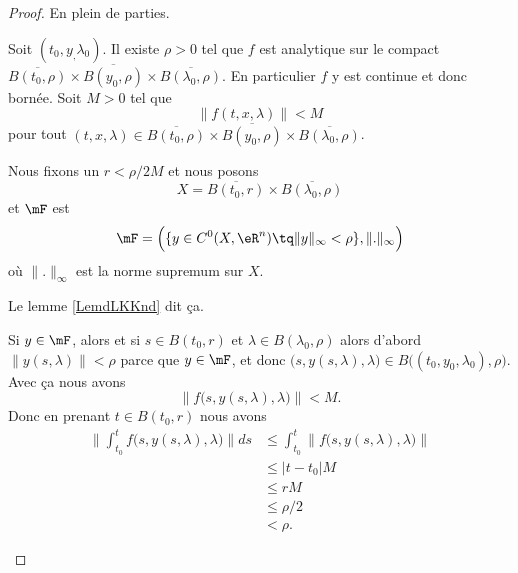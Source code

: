 \begin{proof}
	En plein de parties.
	\begin{subproof}
		Soit \( (t_0,y_,\lambda_0)\). Il existe \( \rho>0\) tel que \( f\) est analytique sur le compact \( \overline{B(t_0,\rho)}\times \overline{B(y_0,\rho)}\times \overline{B(\lambda_0,\rho)}\). En particulier \( f\) y est continue et donc bornée. Soit \( M>0\) tel que
		\begin{equation}
			\| f(t,x,\lambda) \|<M
		\end{equation}
		pour tout \( (t,x,\lambda)\in \overline{B(t_0,\rho)}\times \overline{B(y_0,\rho)}\times \overline{B(\lambda_0,\rho)}\).

		\spitem[L'espace \( \mF\)]
		Nous fixons un \( r<\rho/2M\) et nous posons
		\begin{equation}
			X=\overline{B(t_0,r)}\times \overline{B(\lambda_0,\rho)}
		\end{equation}
		et \( \mF\) est
		\begin{equation}
			\mF=\Big(   \{ y\in C^0(X,\eR^n)\tq \| y \|_{\infty}<\rho \},\| . \|_{\infty} \Big)
		\end{equation}
		où \( \| . \|_{\infty}\) est la norme supremum sur \( X\).

		Le lemme \ref{LemdLKKnd} dit ça.

		Si \( y\in\mF\), alors et si \( s\in B(t_0,r)\) et \( \lambda\in B(\lambda_0,\rho)\) alors d'abord \( \| y(s,\lambda) \|<\rho\) parce que \( y\in\mF\), et donc \( \big( s,y(s,\lambda),\lambda \big)\in B\big( (t_0,y_0,\lambda_0),\rho \big)\). Avec ça nous avons
		\begin{equation}		\label{EQooYPDTooLRKJrX}
			\| f\big( s,y(s,\lambda),\lambda \big) \|<M.
		\end{equation}
		Donc en prenant \( t\in B(t_0,r)\) nous avons
		\begin{subequations}
			\begin{align}
				\| \int_{t_0}^tf\big( s,y(s,\lambda),\lambda \big) \|ds & \leq\int_{t_0}^t\| f\big( s,y(s,\lambda),\lambda \big) \| \\
				                                                        & \leq | t-t_0 |M                                           \\
				                                                        & \leq rM                                                   \\
				                                                        & \leq \rho/2                                               \\
				                                                        & <\rho.
			\end{align}
		\end{subequations}


\end{subproof}
\end{proof}
